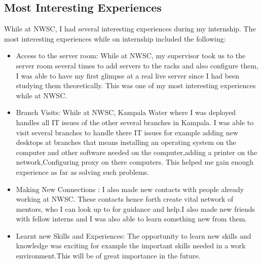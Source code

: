 \documentclass{article}
\begin{document}
\subsection{Most Interesting Experiences}
While at NWSC, I had several interesting experiences during my internship. The most interesting experiences while on internship included the following:\\
\begin{itemize}
\item Access to the server room: While at NWSC, my supervisor took us to the server room several times to add servers to the racks and also configure them, I was able to have my first glimpse at a real live server since I had been studying them theoretically. This was one of my most interesting experiences while at NWSC.
\item Branch Visits: While at NWSC, Kampala Water where I was deployed handles all IT issues of the other several branches in Kampala. I was able to visit several branches to handle there IT issues for example adding new desktops at branches that means installing an operating system on the computer and other software needed on the computer,adding a printer on the network,Configuring proxy on there computers. This helped me gain enough experience as far as solving such problems.
\item Making New Connections : I also made new contacts with people already working at NWSC. These contacts hence forth create vital network of mentors, who I can look up to for guidance and help.I also made new friends with fellow interns and I was also able to learn something new from them.
\item Learnt new Skills and Experiences: The opportunity to learn new skills and knowledge was exciting for example the important skills needed in a work environment.This will be of great importance in the future.
\end{itemize}
\end{document}
